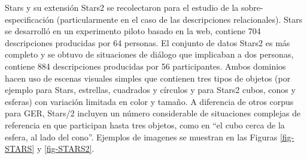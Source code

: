 \label{sec:corpusSTARS}
Stars \cite{stars-mutual-disamb} y su extensi\'on Stars2 se recolectaron para el estudio de la sobre-especificaci\'on (particularmente en el caso de las descripciones relacionales). Stars se desarroll\'o en un experimento piloto basado en la web, contiene 704 descripciones producidas por 64 personas. El conjunto de datos Stars2 es m\'as completo y se obtuvo de situaciones de di\'alogo que implicaban a dos personas, contiene 884 descripciones producidas por 56 participantes. Ambos dominios hacen uso de escenas visuales simples que contienen tres tipos de objetos (por ejemplo para Stars, estrellas, cuadrados y c\'irculos y para Stars2 cubos, conos y esferas) con variaci\'on limitada en color y tama\~no. A diferencia de otros corpus para GER, Stars/2 incluyen un n\'umero considerable de situaciones complejas de referencia en que participan hasta tres objetos, como en ``el cubo cerca de la esfera, al lado del cono''. Ejemplos de imagenes se muestran en las Figuras \ref{fig-STARS} y \ref{fig-STARS2}.


